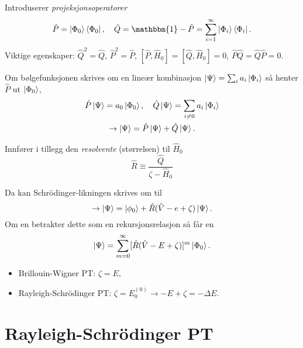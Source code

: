 \documentclass{beamer}
\begin{document}
\begin{frame}
	Introduserer \emph{projeksjonsoperatorer}
	\begin{equation}
		\hat P = \ket{\Phi_0}\bra{\Phi_0}, \quad \hat Q = \mathbbm{1} - \hat P = \sum_{i = 1}^{\infty} \ket{\Phi_i}\bra{\Phi_i}.
	\end{equation}
	Viktige egenskaper: $\hat Q^2 = \hat Q$, $\hat P^2 =  \hat P$, $[\hat P, \hat H_0] = [\hat Q, \hat H_0] = 0$, $\hat P \hat Q = \hat Q \hat P = 0$.

	Om bølgefunksjonen skrives om en lineær kombinasjon $\ket{\Psi} = \sum_i a_i \ket{\Phi_i}$ så henter $\hat P$ ut $\ket{\Phi_0}$,
	\begin{gather}
		\hat P \ket{\Psi} = a_0\ket{\Phi_0}, \quad \hat Q \ket{\Psi} = \sum_{i\neq 0} a_i \ket{\Phi_i}\\
		\rightarrow \ket{\Psi} = \hat P \ket{\Psi} + \hat Q \ket{\Psi}.
	\end{gather}

\end{frame}

\begin{frame}

	Innfører i tillegg den \emph{resolvente} (størrelsen) til $\hat H_0$
	\begin{equation}
		 \hat R \equiv \frac{\hat Q}{\zeta - \hat H_0} 
	\end{equation}
	
	Da kan Schrödinger-likningen skrives om til
	\begin{equation}
		\rightarrow \ket{\Psi} = \ket{\phi_0} + \hat R(\hat V - e + \zeta)\ket{\Psi}.
	\end{equation}
	Om en betrakter dette som en rekursjonsrelasjon så får en
	\begin{equation}
		\ket{\Psi} = \sum_{m=0}^\infty [\hat R(\hat V - E + \zeta)]^m \ket{\Phi_0}.
	\end{equation}
	
	\begin{itemize}
		\item Brillouin-Wigner PT: $\zeta = E$,
		\item Rayleigh-Schrödinger PT: $\zeta = E_0^{(0)} \to -E + \zeta = - \Delta E$.  	
	\end{itemize}	
	
\end{frame}


\section{Rayleigh-Schrödinger PT}
\end{document}

